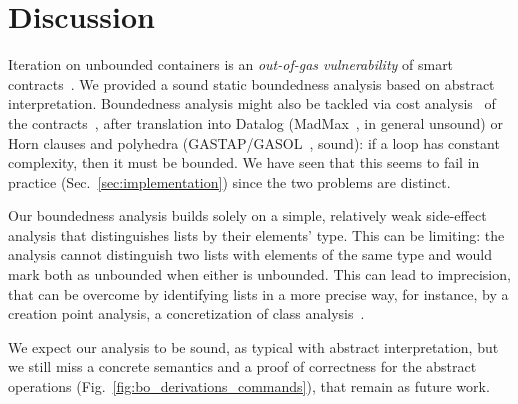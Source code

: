 \section{Discussion}\label{sec:discussion}
%
Iteration on unbounded containers is an
\emph{out-of-gas vulnerability} of smart contracts~\cite{AlbertGRS19}.
We provided a sound static boundedness analysis
based on abstract interpretation.
Boundedness analysis might also be tackled via
cost analysis~\cite{AlbertAGP11} of the contracts~\cite{PerezKLMH20},
after translation
into Datalog (MadMax~\cite{GrechKJBSS18}, in general unsound)
or Horn clauses and polyhedra (GASTAP/GASOL~\cite{AlbertCGRR20}, sound):
if a loop has constant complexity, then it must be bounded.
We have seen that this seems to fail in practice
(Sec.~\ref{sec:implementation}) since the two problems are distinct.

Our boundedness
analysis builds solely on a simple, relatively weak side-effect analysis
that distinguishes lists by their elements' type.
This can be limiting: the
analysis cannot distinguish two lists with elements of the same type and
would mark both as unbounded when either is unbounded.
This can lead to imprecision, that can be overcome by identifying
lists in a more precise way, for instance, by a creation point analysis,
a concretization of class analysis~\cite{TipP00}.

We expect our analysis to be sound, as typical with abstract
interpretation, but we still miss a concrete semantics and a proof of
correctness for the abstract operations (Fig.~\ref{fig:bo_derivations_commands}),
that remain as future work.
